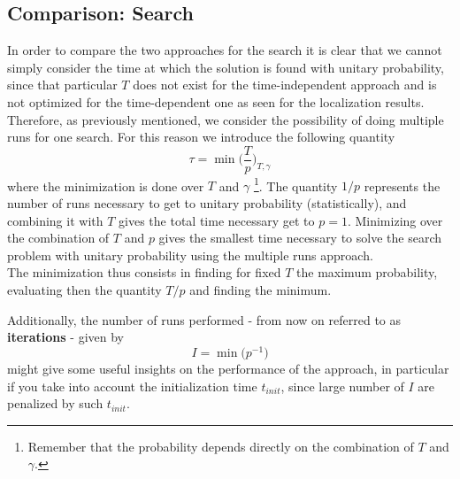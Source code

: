     \subsection{Comparison: Search}
        In order to compare the two approaches for the search it is clear that we cannot simply consider the time at which the solution is found with unitary probability, since that particular $T$ does not exist for the time-independent approach and is not optimized for the time-dependent one as seen for the localization results. Therefore, as previously mentioned, we consider the possibility of doing multiple runs for one search. For this reason we introduce the following quantity
        \begin{equation}
          \tau = \min\bigg(\frac{T}{p}\bigg)_{T, \gamma}
        \end{equation}
        where the minimization is done over $T$ and $\gamma$ \footnote{Remember that the probability depends directly on the combination of $T$ and $\gamma$.}. The quantity $1/p$ represents the number of runs necessary to get to unitary probability (statistically), and combining it with $T$ gives the total time necessary get to $p=1$. Minimizing over the combination of $T$ and $p$ gives the smallest time necessary to solve the search problem with unitary probability using the multiple runs approach.\\ The minimization thus consists in finding for fixed $T$ the maximum probability, evaluating then the quantity $T/p$ and finding the minimum.


        \noindent
        Additionally, the number of runs performed - from now on referred to as \textbf{iterations} - given by
        \begin{equation}
          I = \min\big(p^{-1}\big)
        \end{equation}
        might give some useful insights on the performance of the approach, in particular if you take into account the initialization time $t_{init}$, since large number of $I$ are penalized by such $t_{init}$.\\


